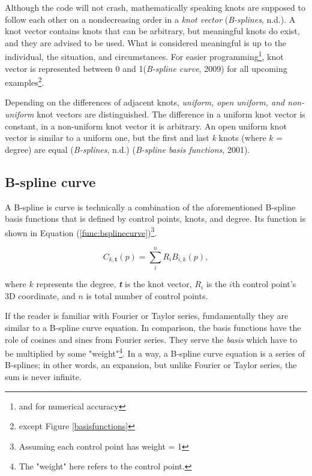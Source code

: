 \documentclass{article}
\begin{document}
Although the code will not crash, mathematically speaking knots are supposed to follow each other on a nondecreasing order in a \emph{knot vector} (\emph{B-splines}, n.d.). A knot vector contains knots that can be arbitrary, but meaningful knots do exist, and they are advised to be used. What is considered meaningful is up to the individual, the situation, and circumstances. For easier programming\footnote{and for numerical accuracy}, knot vector is represented between 0 and 1(\emph{B-spline curve}, 2009) for all upcoming examples\footnote{except Figure \ref{basisfunctions}}.

Depending on the differences of adjacent knots, \emph{uniform, open uniform, and non-uniform} knot vectors are distinguished. The difference in a uniform knot vector is constant, in a non-uniform knot vector it is arbitrary. An open uniform knot vector is similar to a uniform one, but the first and last \emph{k} knots (where $k$ = degree) are equal (\emph{B-splines}, n.d.) (\emph{B-spline basis functions}, 2001).

\subsection{B-spline curve}

\vspace{6pt}
A B-spline is curve is technically a combination of the aforementioned B-spline basis functions that is defined by control points, knots, and degree. Its function is shown in Equation (\ref{func:bsplinecurve})\footnote{Assuming each control point has weight = 1}.

\begin{equation}
C_{k, \mathbf{t}}(p) = \sum_{i}^n R_{i} B_{i, k}(p),
\label{func:bsplinecurve}
\end{equation}

where $k$ represents the degree, \emph{\textbf{t}} is the knot vector, $R_i$ is the $i$th control point's 3D coordinate, and $n$ is total number of control points.

If the reader is familiar with Fourier or Taylor series, fundamentally they are similar to a B-spline curve equation. In comparison, the basis functions have the role of cosines and sines from Fourier series. They serve the \emph{basis} which have to be multiplied by some "weight"\footnote{The "weight" here refers to the control point.}. In a way, a B-spline curve equation is a series of B-splines; in other words, an expansion, but unlike Fourier or Taylor series, the sum is never infinite.
\end{document}
